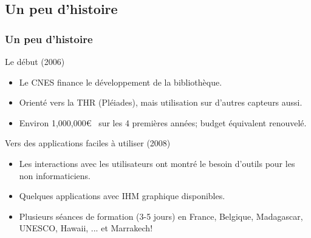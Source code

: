 \documentclass[compress,handout]{beamer}
\begin{document}
\subsection{Un peu d'histoire}
\begin{frame}
\frametitle{Un peu d'histoire}
\begin{block}{Le début (2006)}
\scriptsize
\begin{itemize}
 \item Le CNES finance le développement de la bibliothèque.
 \item Orienté vers la THR (Pléiades), mais utilisation sur d'autres
   capteurs aussi.
 \item Environ 1,000,000\euro~ sur les 4 premières années; budget
   équivalent renouvelé.
\end{itemize}
\end{block}
\begin{block}{Vers des applications faciles à utiliser (2008)}
\scriptsize
\begin{itemize}
  \item Les interactions avec les utilisateurs ont montré le besoin
    d'outils pour les non informaticiens.
  \item Quelques applications avec IHM graphique disponibles.
  \item Plusieurs séances de formation (3-5 jours) en France,
    Belgique, Madagascar, UNESCO, Hawaii, ... et Marrakech!
\end{itemize}
\end{block}
\end{frame}
\end{document}
